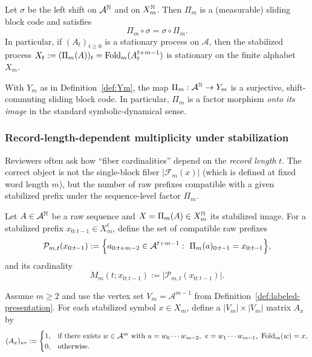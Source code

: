 \begin{proposition}\label{prop:Pi_m_factor}
Let $\sigma$ be the left shift on $\mathcal{A}^{\mathbb{N}}$ and on $X_m^{\mathbb{N}}$. Then $\Pi_m$ is a (measurable) sliding block code and satisfies
\[
\Pi_m\circ\sigma=\sigma\circ \Pi_m.
\]
In particular, if $(A_t)_{t\ge 0}$ is a stationary process on $\mathcal{A}$, then the stabilized process $X_t:=(\Pi_m(A))_t=\mathrm{Fold}_m(A_t^{t+m-1})$ is stationary on the finite alphabet $X_m$.
\end{proposition}

\begin{corollary}\label{cor:Pi_m_onto_Ym}
With $Y_m$ as in Definition~\ref{def:Ym}, the map $\Pi_m:\mathcal{A}^{\mathbb{N}}\to Y_m$ is a surjective, shift-commuting sliding block code. In particular, $\Pi_m$ is a factor morphism \emph{onto its image} in the standard symbolic-dynamical sense.
\end{corollary}

\subsubsection{Record-length-dependent multiplicity under stabilization}\label{sec:stabilization:record-length}
Reviewers often ask how ``fiber cardinalities'' depend on the \emph{record length} $t$. The correct object is not the single-block fiber $|\mathcal{F}_m(x)|$ (which is defined at fixed word length $m$), but the number of raw prefixes compatible with a given stabilized prefix under the sequence-level factor $\Pi_m$.

\begin{definition}\label{def:prefix-preimage}
Let $A\in\mathcal{A}^{\mathbb{N}}$ be a raw sequence and $X=\Pi_m(A)\in X_m^{\mathbb{N}}$ its stabilized image. For a stabilized prefix $x_{0:t-1}\in X_m^t$, define the set of compatible raw prefixes
\[
\mathcal{P}_{m,t}(x_{0:t-1})
:=\Bigl\{a_{0:t+m-2}\in\mathcal{A}^{t+m-1}:\ \Pi_m(a)_{0:t-1}=x_{0:t-1}\Bigr\},
\]
and its cardinality
\[
M_{m}(t;x_{0:t-1}) := \bigl|\mathcal{P}_{m,t}(x_{0:t-1})\bigr|.
\]
\end{definition}

\begin{definition}\label{def:label-matrices}
Assume $m\ge 2$ and use the vertex set $V_m=\mathcal{A}^{m-1}$ from Definition~\ref{def:labeled-presentation}. For each stabilized symbol $x\in X_m$, define a $|V_m|\times |V_m|$ matrix $A_x$ by
\[
(A_x)_{uv} :=
\begin{cases}
1,& \text{if there exists }w\in\mathcal{A}^m \text{ with }u=w_0\cdots w_{m-2},\ v=w_1\cdots w_{m-1},\ \mathrm{Fold}_m(w)=x,\\
0,& \text{otherwise.}
\end{cases}
\]
\end{definition}

